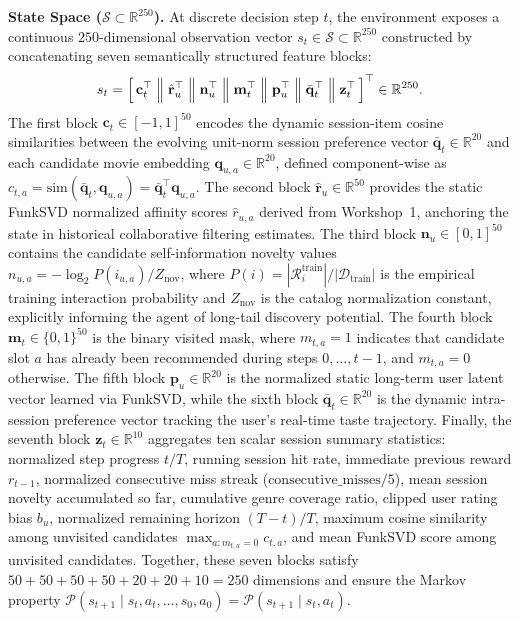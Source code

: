 \textbf{State Space ($\mathcal{S} \subset \mathbb{R}^{250}$).} At discrete decision step $t$, the environment exposes a continuous $250$-dimensional observation vector $s_t \in \mathcal{S} \subset \mathbb{R}^{250}$ constructed by concatenating seven semantically structured feature blocks:
\begin{equation}
\label{eq:state_vector}
s_t = \Bigl[\, \mathbf{c}_t^\top \;\Big\|\; \hat{\mathbf{r}}_u^\top \;\Big\|\; \mathbf{n}_u^\top \;\Big\|\; \mathbf{m}_t^\top \;\Big\|\; \mathbf{p}_u^\top \;\Big\|\; \bar{\mathbf{q}}_t^\top \;\Big\|\; \mathbf{z}_t^\top \,\Bigr]^\top \in \mathbb{R}^{250}.
\end{equation}
The first block $\mathbf{c}_t \in [-1, 1]^{50}$ encodes the dynamic session-item cosine similarities between the evolving unit-norm session preference vector $\bar{\mathbf{q}}_t \in \mathbb{R}^{20}$ and each candidate movie embedding $\mathbf{q}_{u,a} \in \mathbb{R}^{20}$, defined component-wise as $c_{t,a} = \text{sim}(\bar{\mathbf{q}}_t, \mathbf{q}_{u,a}) = \bar{\mathbf{q}}_t^\top \mathbf{q}_{u,a}$. The second block $\hat{\mathbf{r}}_u \in \mathbb{R}^{50}$ provides the static FunkSVD normalized affinity scores $\hat{r}_{u,a}$ derived from Workshop~1, anchoring the state in historical collaborative filtering estimates. The third block $\mathbf{n}_u \in [0, 1]^{50}$ contains the candidate self-information novelty values $n_{u,a} = -\log_2 P(i_{u,a}) / Z_{\text{nov}}$, where $P(i) = |\mathcal{R}_i^{\text{train}}| / |\mathcal{D}_{\text{train}}|$ is the empirical training interaction probability and $Z_{\text{nov}}$ is the catalog normalization constant, explicitly informing the agent of long-tail discovery potential. The fourth block $\mathbf{m}_t \in \{0, 1\}^{50}$ is the binary visited mask, where $m_{t,a} = 1$ indicates that candidate slot $a$ has already been recommended during steps $0, \dots, t-1$, and $m_{t,a} = 0$ otherwise. The fifth block $\mathbf{p}_u \in \mathbb{R}^{20}$ is the normalized static long-term user latent vector learned via FunkSVD, while the sixth block $\bar{\mathbf{q}}_t \in \mathbb{R}^{20}$ is the dynamic intra-session preference vector tracking the user's real-time taste trajectory. Finally, the seventh block $\mathbf{z}_t \in \mathbb{R}^{10}$ aggregates ten scalar session summary statistics: normalized step progress $t/T$, running session hit rate, immediate previous reward $r_{t-1}$, normalized consecutive miss streak ($\text{consecutive\_misses}/5$), mean session novelty accumulated so far, cumulative genre coverage ratio, clipped user rating bias $b_u$, normalized remaining horizon $(T-t)/T$, maximum cosine similarity among unvisited candidates $\max_{a : m_{t,a}=0} c_{t,a}$, and mean FunkSVD score among unvisited candidates. Together, these seven blocks satisfy $50 + 50 + 50 + 50 + 20 + 20 + 10 = 250$ dimensions and ensure the Markov property $\mathcal{P}(s_{t+1} \mid s_t, a_t, \dots, s_0, a_0) = \mathcal{P}(s_{t+1} \mid s_t, a_t)$.

